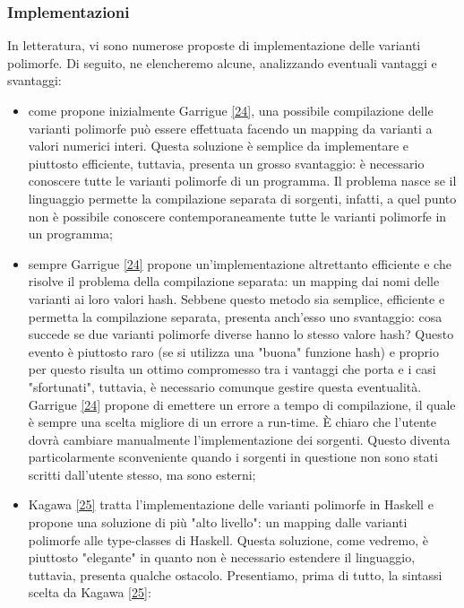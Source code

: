 \documentclass[10pt,a4paper]{article}
\begin{document}
\subsubsection{Implementazioni}
In letteratura, vi sono numerose proposte di implementazione delle varianti polimorfe. Di seguito, ne elencheremo alcune,
analizzando eventuali vantaggi e svantaggi:
\begin{itemize}
    \item come propone inizialmente Garrigue \hyperlink{bibl24}{[24]}, una possibile compilazione delle varianti polimorfe
    può essere effettuata
    facendo un mapping da varianti a valori numerici interi. Questa soluzione è semplice da implementare e piuttosto
    efficiente, tuttavia, presenta un grosso svantaggio: è necessario conoscere tutte le varianti polimorfe di un programma.
    Il problema nasce se il linguaggio permette la compilazione separata di sorgenti, infatti, a quel punto non è possibile
    conoscere contemporaneamente tutte le varianti polimorfe in un programma;
    \item sempre Garrigue \hyperlink{bibl24}{[24]} propone un'implementazione altrettanto efficiente e che risolve il
    problema della
    compilazione separata: un mapping dai nomi delle varianti ai loro valori hash. Sebbene questo metodo sia semplice,
    efficiente e permetta la compilazione separata, presenta anch'esso uno svantaggio: cosa succede se due varianti
    polimorfe diverse hanno lo stesso valore hash? Questo evento è piuttosto raro (se si utilizza una "buona" funzione hash)
    e proprio per questo risulta un ottimo compromesso tra i vantaggi che porta e i casi "sfortunati", tuttavia, è
    necessario comunque gestire questa eventualità. Garrigue \hyperlink{bibl24}{[24]} propone di emettere un errore a tempo
    di compilazione,
    il quale è sempre una scelta migliore di un errore a run-time. \`E chiaro che l'utente dovrà cambiare manualmente
    l'implementazione dei sorgenti. Questo diventa particolarmente sconveniente quando i sorgenti in questione non sono
    stati scritti dall'utente stesso, ma sono esterni;
    \item Kagawa \hyperlink{bibl25}{[25]} tratta l'implementazione delle varianti polimorfe in Haskell e propone una
    soluzione di più
    "alto livello": un mapping dalle varianti polimorfe alle type-classes di Haskell. Questa soluzione, come vedremo, è
    piuttosto "elegante" in quanto non è necessario estendere il linguaggio, tuttavia, presenta qualche ostacolo.
    Presentiamo, prima di tutto, la sintassi scelta da Kagawa \hyperlink{bibl25}{[25]}:

\end{itemize}
\end{document}
